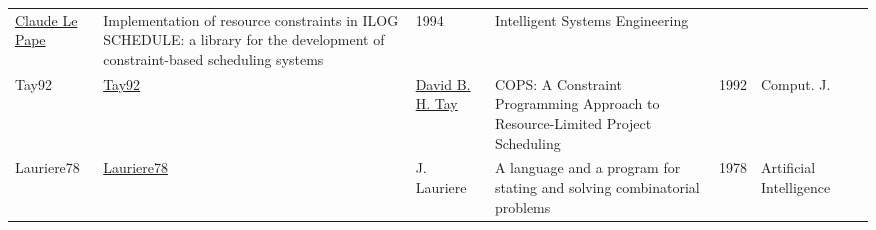 {\begin{longtable}{p{2cm}p{2cm}p{5cm}p{10cm}rp{3cm}l}
\hyperref[auth:a165]{Claude Le Pape} & Implementation of resource constraints in ILOG SCHEDULE: a library for the development of constraint-based scheduling systems & 1994 & Intelligent Systems Engineering & \cite{Pape94}\\Tay92 & \href{}{Tay92} & \hyperref[auth:a711]{David B. H. Tay} & {COPS:} {A} Constraint Programming Approach to Resource-Limited Project Scheduling & 1992 & Comput. J. & \cite{Tay92}\\Lauriere78 & \href{http://dx.doi.org/10.1016/0004-3702(78)90029-2}{Lauriere78} & J. Lauriere & A language and a program for stating and solving combinatorial problems & 1978 & Artificial Intelligence & \cite{Lauriere78}\\\end{longtable}
}

